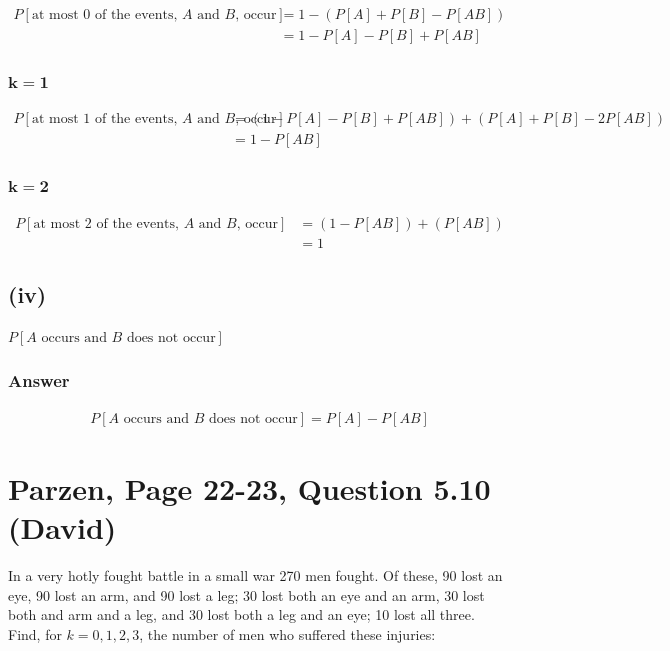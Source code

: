 \documentclass[11pt]{article}
\begin{document}
\begin{align*}
    P[\text{at most } 0 \text{ of the events, } A \text{ and } B \text{, occur}] &= 1-(P[A] + P[B] -P[AB])\\
    &= 1- P[A] - P[B] + P[AB]
\end{align*}

\subsubsection*{$\mathbf{k=1}$}
\begin{align*}
    P[\text{at most } 1 \text{ of the events, } A \text{ and } B \text{, occur}] &= (1-P[A] -P[B] + P[AB]) + (P[A] +P[B] -2P[AB])\\
    &= 1-P[AB]
\end{align*}
\subsubsection*{$\mathbf{k=2}$}
\begin{align*}
    P[\text{at most } 2 \text{ of the events, } A \text{ and } B \text{, occur}] &= (1-P[AB]) + (P[AB])\\
    &= 1
\end{align*}


\subsection*{(iv)}

\(P[A \text{ occurs and } B \text{ does not occur}]\)

\subsubsection*{Answer}

\begin{align*}
    P[A \text{ occurs and } B \text{ does not occur}] = P[A] - P[AB]
\end{align*}

\section*{Parzen, Page 22-23, Question 5.10 (David)}

In a very hotly fought battle in a small war 270 men fought. Of these,
90 lost an eye, 90 lost an arm, and 90 lost a leg;
30 lost both an eye and an arm, 30 lost both and arm and a leg, and 30 lost both a leg and an eye;
10 lost all three.
Find, for \(k = 0, 1, 2, 3\), the number of men who suffered these injuries:
\end{document}
